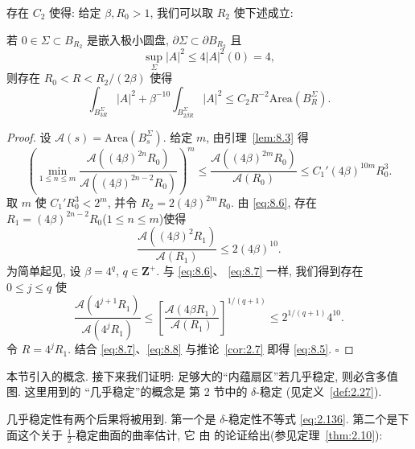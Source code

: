 \begin{corollary}
\label{cor:8.4}
存在 $C_2$ 使得: 给定 $\beta,R_0>1$, 我们可以取 $R_2$ 使下述成立:

若 $0\in\Sigma\subset B_{R_2}$ 是嵌入极小圆盘, $\partial\Sigma\subset
\partial B_{R_2}$ 且
\[
\sup_\Sigma|A|^2\leq 4|A|^2(0)=4,
\]
则存在 $R_0<R<R_2/(2\beta)$ 使得
\begin{equation}
\int_{B_{3R}^\Sigma}|A|^2
+\beta^{-10}\int_{B_{2\beta R}^\Sigma}|A|^2
\leq C_2R^{-2}\mathrm{Area}(B_R^\Sigma).
\label{eq:8.5}
\end{equation}
\end{corollary}

\begin{proof}
设 $\mathcal A(s)=\mathrm{Area}(B_s^\Sigma)$. 给定 $m$, 由引理~\ref{lem:8.3} 得
\begin{equation}
\left(\min_{1\leq n\leq m}
\frac{\mathcal A((4\beta)^{2n}R_0)}{\mathcal A((4\beta)^{2n-2}R_0)}\right)^m
\leq\frac{\mathcal A((4\beta)^{2m}R_0)}{\mathcal A(R_0)}
\leq C_1'(4\beta)^{10m}R_0^3.
\label{eq:8.6}
\end{equation}
取 $m$ 使 $C_1'R_0^3<2^m$, 并令 $R_2=2(4\beta)^{2m}R_0$. 由
\eqref{eq:8.6}, 存在 $R_1=(4\beta)^{2n-2}R_0$($1\leq n\leq m$)使得
\begin{equation}
\frac{\mathcal A((4\beta)^2R_1)}{\mathcal A(R_1)}
\leq 2(4\beta)^{10}.
\label{eq:8.7}
\end{equation}
为简单起见, 设 $\beta=4^q$, $q\in\mathbf Z^+$. 与 \eqref{eq:8.6}、
\eqref{eq:8.7} 一样, 我们得到存在 $0\leq j\leq q$ 使
\begin{equation}
\frac{\mathcal A(4^{j+1}R_1)}{\mathcal A(4^jR_1)}
\leq\left[\frac{\mathcal A(4\beta R_1)}{\mathcal A(R_1)}\right]^{1/(q+1)}
\leq 2^{1/(q+1)}4^{10}.
\label{eq:8.8}
\end{equation}
令 $R=4^jR_1$. 结合 \eqref{eq:8.7}、\eqref{eq:8.8} 与推论~\ref{cor:2.7}
即得 \eqref{eq:8.5}. $\square$
\end{proof}



本节引入的概念. 接下来我们证明: 足够大的``内蕴扇区''若几乎稳定, 则必含多值图. 这里用到的
``几乎稳定''的概念是 \cite{CM4} 第 2 节中的 $\delta$-稳定
(见定义~\ref{def:2.27}).

几乎稳定性有两个后果将被用到. 第一个是 $\delta$-稳定性不等式
\eqref{eq:2.136}. 第二个是下面这个关于 $\frac12$-稳定曲面的曲率估计, 它
由 \cite{CM2} 的论证给出(参见定理~\ref{thm:2.10}):

